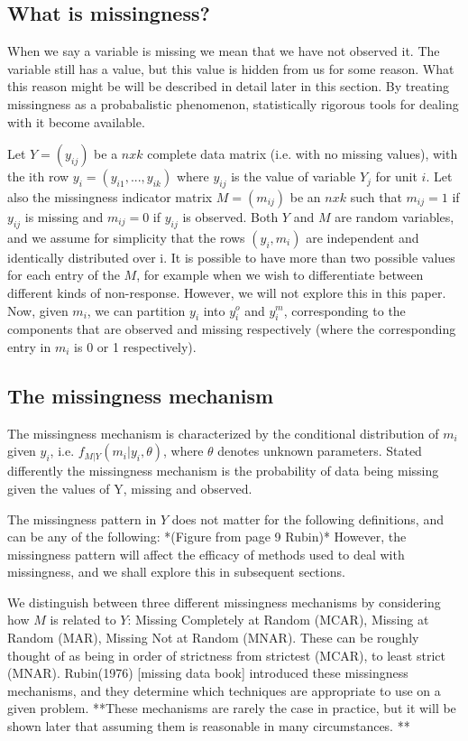 \documentclass{article}
\begin{document}
	\subsection{What is missingness?}
	When we say a variable is missing we mean that we have not observed it. The variable still has a value, but this value is hidden from us for some reason. What this reason might be will be described in detail later in this section. By treating missingness as a probabalistic phenomenon, statistically rigorous tools for dealing with it become available. 
	
	Let $Y=(y_{ij})$ be a $nxk$ complete data matrix (i.e. with no missing values), with the ith row $y_{i}=(y_{i1}, ..., y_{ik})$ where $y_{ij}$ is the value of variable $Y_{j}$ for unit $i$. Let also the missingness indicator matrix $M = (m_{ij})$ be an $nxk$ such that $m_{ij} = 1$ if $y_{ij}$ is missing and $m_{ij} = 0$ if $y_{ij}$ is observed. Both $Y$ and $M$ are random variables, and we assume for simplicity that the rows $(y_{i}, m_{i})$ are independent and identically distributed over i. It is possible to have more than two possible values for each entry of the $M$, for example when we wish to differentiate between different kinds of non-response. However, we will not explore this in this paper. Now, given $m_{i}$, we can partition $y_{i}$ into $y^{o}_{i}$ and $y^{m}_{i}$, corresponding to the components that are observed and missing respectively (where the corresponding entry in $m_{i}$ is 0 or 1 respectively).
	
	\subsection{The missingness mechanism}
	
	The missingness mechanism is characterized by the conditional distribution of $m_{i}$ given $y_{i}$, i.e. $f_{M|Y}(m_{i}|y_{i}, \theta)$, where $\theta$ denotes unknown parameters. Stated differently the missingness mechanism is the probability of data being missing given the values of Y, missing and observed. 
	
	The missingness pattern in $Y$ does not matter for the following definitions, and can be any of the following: *(Figure from page 9 Rubin)* 
	However, the missingness pattern will affect the efficacy of methods used to deal with missingness, and we shall explore this in subsequent sections.
	
	We distinguish between three different missingness mechanisms by considering how $M$ is related to $Y$: Missing Completely at Random (MCAR), Missing at Random (MAR), Missing Not at Random (MNAR). These can be roughly thought of as being in order of strictness from strictest (MCAR), to least strict (MNAR). Rubin(1976) [missing data book] introduced these missingness mechanisms, and they determine which techniques are appropriate to use on a given problem. **These mechanisms are rarely the case in practice, but it will be shown later that assuming them is reasonable in many circumstances. **
	
\end{document}
